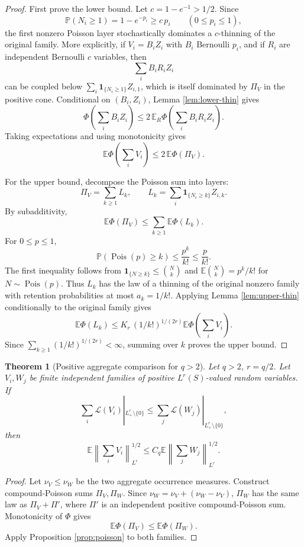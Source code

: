\documentclass[11pt]{article}
\newtheorem{theorem}{Theorem}
\newcommand{\E}{\mathbb E}
\newcommand{\Pp}{\mathbb P}
\newcommand{\norm}[1]{\left\lVert #1\right\rVert}
\newcommand{\PhiF}{\Phi}
\begin{document}
\begin{proof}
First prove the lower bound.  Let \(c=1-e^{-1}>1/2\).  Since
\[
  \Pp(N_i\ge1)=1-e^{-p_i}\ge c\,p_i
  \qquad(0\le p_i\le1),
\]
the first nonzero Poisson layer stochastically dominates a \(c\)-thinning of
the original family.  More explicitly, if \(V_i=B_iZ_i\) with
\(B_i\) Bernoulli \(p_i\), and if \(R_i\) are independent Bernoulli \(c\)
variables, then
\[
  \sum_i B_iR_iZ_i
\]
can be coupled below \(\sum_i \mathbf 1_{\{N_i\ge1\}}Z_{i,1}\), which is
itself dominated by \(\Pi_V\) in the positive cone.  Conditional on
\((B_i,Z_i)\), Lemma \ref{lem:lower-thin} gives
\[
  \PhiF\left(\sum_i B_iZ_i\right)
  \le
  2\,\E_R\PhiF\left(\sum_i B_iR_iZ_i\right).
\]
Taking expectations and using monotonicity gives
\[
  \E\PhiF\left(\sum_iV_i\right)
  \le
  2\,\E\PhiF(\Pi_V).
\]

For the upper bound, decompose the Poisson sum into layers:
\[
  \Pi_V
  =
  \sum_{k\ge1} L_k,
  \qquad
  L_k=\sum_i \mathbf 1_{\{N_i\ge k\}}Z_{i,k}.
\]
By subadditivity,
\[
  \E\PhiF(\Pi_V)\le \sum_{k\ge1}\E\PhiF(L_k).
\]
For \(0\le p\le1\),
\[
  \Pp(\operatorname{Pois}(p)\ge k)
  \le \frac{p^k}{k!}\le \frac{p}{k!}.
\]
The first inequality follows from
\(\mathbf 1_{\{N\ge k\}}\le \binom{N}{k}\) and
\(\E\binom{N}{k}=p^k/k!\) for \(N\sim\operatorname{Pois}(p)\).
Thus \(L_k\) has the law of a thinning of the original nonzero family with
retention probabilities at most \(a_k=1/k!\).  Applying Lemma
\ref{lem:upper-thin} conditionally to the original family gives
\[
  \E\PhiF(L_k)
  \le
  K_r\,(1/k!)^{1/(2r)}
  \E\PhiF\left(\sum_iV_i\right).
\]
Since \(\sum_{k\ge1}(1/k!)^{1/(2r)}<\infty\), summing over \(k\) proves the
upper bound.
\end{proof}

\begin{theorem}[Positive aggregate comparison for \(q>2\)]
\label{thm:positive-qgt2}
Let \(q>2\), \(r=q/2\).  Let \(V_i,W_j\) be finite independent families of
positive \(L^r(S)\)-valued random variables.  If
\[
  \sum_i\mathcal L(V_i)|_{L^r_+\setminus\{0\}}
  \le
  \sum_j\mathcal L(W_j)|_{L^r_+\setminus\{0\}},
\]
then
\[
  \E\norm{\sum_iV_i}_{L^r}^{1/2}
  \le
  C_q
  \E\norm{\sum_jW_j}_{L^r}^{1/2}.
\]
\end{theorem}

\begin{proof}
Let \(\nu_V\le\nu_W\) be the two aggregate occurrence measures.  Construct
compound-Poisson sums \(\Pi_V,\Pi_W\).  Since \(\nu_W=\nu_V+(\nu_W-\nu_V)\),
\(\Pi_W\) has the same law as \(\Pi_V+\Pi'\), where \(\Pi'\) is an independent
positive compound-Poisson sum.  Monotonicity of \(\PhiF\) gives
\[
  \E\PhiF(\Pi_V)\le \E\PhiF(\Pi_W).
\]
Apply Proposition \ref{prop:poisson} to both families.
\end{proof}
\end{document}
